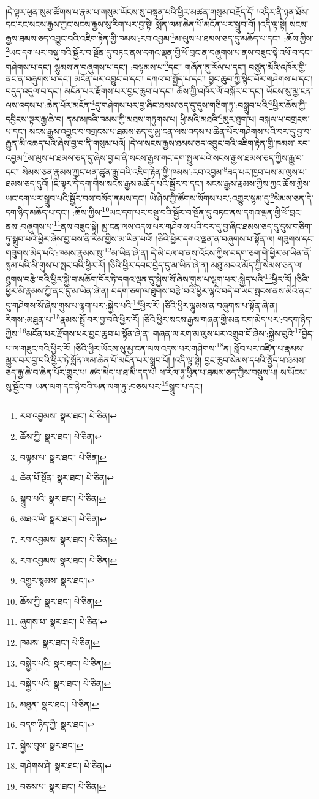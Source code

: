 །དེ་ལྟར་ཕུན་སུམ་ཚོགས་པ་རྣམ་པ་གསུམ་ཡོངས་སུ་བསྟན་པའི་ཕྱིར་མཚན་གསུམ་བརྗོད་དོ། །འདིར་ནི་ཉན་ཐོས་དང་རང་སངས་རྒྱས་ཀྱང་སངས་རྒྱས་སུ་རིག་པར་བྱ་སྟེ། སྨོན་ལམ་ཆེན་པོ་མངོན་པར་སྒྲུབ་བོ། །འདི་ལྟ་སྟེ། སངས་རྒྱས་ཐམས་ཅད་འབྱུང་བའི་འཇིག་རྟེན་གྱི་ཁམས་:རབ་འབྱམ་\footnote{རབ་འབྱམས་  སྣར་ཐང་།  པེ་ཅིན། }མ་ལུས་པ་ཐམས་ཅད་དུ་མཆོད་པ་དང་། :ཆོས་ཀྱིས་\footnote{ཆོས་ཀྱི་  སྣར་ཐང་།  པེ་ཅིན། }ཡང་དག་པར་བསྡུ་བའི་སྦྱོར་བ་སྔོན་དུ་བཏང་ནས་དགའ་ལྡན་གྱི་ཕོ་བྲང་ན་བཞུགས་པ་ནས་བཟུང་སྟེ་འཕོ་བ་དང་། གཤེགས་པ་དང་། ལྷུམས་ན་བཞུགས་པ་དང་། :བལྟམས་པ་\footnote{བལྟམ་པ་  སྣར་ཐང་།  པེ་ཅིན། }དང་། གཞོན་ནུ་རོལ་པ་དང་། བཙུན་མོའི་འཁོར་གྱི་ནང་ན་བཞུགས་པ་དང་། མངོན་པར་འབྱུང་བ་དང་། དཀའ་བ་སྤྱོད་པ་དང་། བྱང་ཆུབ་ཀྱི་སྙིང་པོར་གཤེགས་པ་དང་། བདུད་འདུལ་བ་དང་། མངོན་པར་རྫོགས་པར་བྱང་ཆུབ་པ་དང་། ཆོས་ཀྱི་འཁོར་ལོ་བསྐོར་བ་དང་། ཡོངས་སུ་མྱ་ངན་ལས་འདས་པ་:ཆེན་པོར་མངོན་\footnote{ཆེན་པོ་སྔོན་  སྣར་ཐང་།  པེ་ཅིན། }དུ་གཤེགས་པར་བྱ་ཞིང་ཐམས་ཅད་དུ་དུས་གཅིག་ཏུ་:བསྒྲུབ་པའི་\footnote{སྒྲུབ་པའི་  སྣར་ཐང་།  པེ་ཅིན། }ཕྱིར་ཆོས་ཀྱི་དབྱིངས་ལྟར་རྒྱ་ཆེ་བ། ནམ་མཁའི་ཁམས་ཀྱི་མཐས་གཏུགས་པ། ཕྱི་མའི་མཐའི་\footnote{མཐའ་ཡི་  སྣར་ཐང་།  པེ་ཅིན། }མུར་ཐུག་པ། བསྐལ་པ་བགྲངས་པ་དང་། སངས་རྒྱས་འབྱུང་བ་བགྲངས་པ་ཐམས་ཅད་དུ་མྱ་ངན་ལས་འདས་པ་ཆེན་པོར་གཤེགས་པའི་བར་དུ་བྱ་བ་རྒྱུན་མི་འཆད་པའི་ཞེས་བྱ་བ་ནི་གསུམ་པའོ། །དེ་ལ་སངས་རྒྱས་ཐམས་ཅད་འབྱུང་བའི་འཇིག་རྟེན་གྱི་ཁམས་:རབ་འབྱམ་\footnote{རབ་འབྱམས་  སྣར་ཐང་།  པེ་ཅིན། }མ་ལུས་པ་ཐམས་ཅད་དུ་ཞེས་བྱ་བ་ནི་སངས་རྒྱས་གང་དག་སྤྲུལ་པའི་སངས་རྒྱས་ཐམས་ཅད་ཀྱིས་རྒྱུ་བ་དང་། སེམས་ཅན་རྣམས་ཀྱང་ཕན་ཚུན་རྒྱུ་བའི་འཇིག་རྟེན་གྱི་ཁམས་:རབ་འབྱམ་\footnote{རབ་འབྱམས་  སྣར་ཐང་།  པེ་ཅིན། }ཟད་པར་ཁྱབ་པས་མ་ལུས་པ་ཐམས་ཅད་དུའོ། །ཇི་ལྟར་དེ་དག་གིས་སངས་རྒྱས་མཆོད་པའི་སྦྱོར་བ་དང་། སངས་རྒྱས་རྣམས་ཀྱིས་ཀྱང་ཆོས་ཀྱིས་ཡང་དག་པར་སྒྲུབ་པའི་སྦྱོར་བས་བསོད་ནམས་དང་། ཡེ་ཤེས་ཀྱི་ཚོགས་སོགས་པར་:འགྱུར་སྙམ་དུ་\footnote{འགྱུར་སྙམས་  སྣར་ཐང་། }སེམས་ཅན་དེ་དག་ཉིད་མཆོད་པ་དང་། :ཆོས་ཀྱིས་\footnote{ཆོས་ཀྱི་  སྣར་ཐང་།  པེ་ཅིན། }ཡང་དག་པར་བསྡུ་བའི་སྦྱོར་བ་སྔོན་དུ་བཏང་ནས་དགའ་ལྡན་གྱི་ཕོ་བྲང་ནས་:བཞུགས་པ་\footnote{ཞུགས་པ་  སྣར་ཐང་།  པེ་ཅིན། }ནས་བཟུང་སྟེ། མྱ་ངན་ལས་འདས་པར་གཤེགས་པའི་བར་དུ་བྱ་ཞིང་ཐམས་ཅད་དུ་དུས་གཅིག་ཏུ་སྒྲུབ་པའི་ཕྱིར་ཞེས་བྱ་བས་ནི་རིམ་གྱིས་མ་ཡིན་པའོ། །ཅིའི་ཕྱིར་དགའ་ལྡན་ན་བཞུགས་པ་སྟོན་ལ། གཟུགས་དང་གཟུགས་མེད་པའི་:ཁམས་རྣམས་སུ་\footnote{ཁམས་  སྣར་ཐང་།  པེ་ཅིན། }མ་ཡིན་ཞེ་ན། དེ་མི་ངལ་བ་ནས་འོངས་ཀྱིས་བདག་ཅག་གི་ཕྱིར་མ་ཡིན་ནོ་སྙམ་པའི་མི་གུས་པ་སྤང་བའི་ཕྱིར་རོ། །ཅིའི་ཕྱིར་དབང་བྱེད་དུ་མ་ཡིན་ཞེ་ན། མཐུ་མངའ་མོད་ཀྱི་སེམས་ཅན་ལ་ཐུགས་བརྩེ་བའི་ཕྱིར་སྐྱེ་བ་མཆོག་བོར་ཏེ་དགའ་ལྡན་དུ་སྐྱེས་སོ་ཞེས་གུས་པ་ལྷག་པར་:སྐྱེད་པའི་\footnote{བསྐྱེད་པའི་  སྣར་ཐང་།  པེ་ཅིན། }ཕྱིར་རོ། །ཅིའི་ཕྱིར་མི་རྣམས་ཀྱི་ནང་དུ་མ་ཡིན་ཞེ་ན། བདག་ཅག་ལ་ཐུགས་བརྩེ་བའི་ཕྱིར་ལྷའི་བདེ་བ་ཡང་སྤངས་ནས་མིའི་ནང་དུ་གཤེགས་སོ་ཞེས་གུས་པ་ལྷག་པར་:སྐྱེད་པའི་\footnote{བསྐྱེད་པའི་  སྣར་ཐང་།  པེ་ཅིན། }ཕྱིར་རོ། །ཅིའི་ཕྱིར་ལྷུམས་ན་བཞུགས་པ་སྟོན་ཞེ་ན། རིགས་:མཐུན་པ་\footnote{མཐུན་  སྣར་ཐང་།  པེ་ཅིན། }རྣམས་སྤྲོ་བར་བྱ་བའི་ཕྱིར་རོ། །ཅིའི་ཕྱིར་སངས་རྒྱས་གཞན་གྱི་མན་ངག་མེད་པར་:བདག་ཉིད་ཀྱིས་\footnote{བདག་ཉིད་ཀྱི་  སྣར་ཐང་། }མངོན་པར་རྫོགས་པར་བྱང་ཆུབ་པ་སྟོན་ཞེ་ན། གཞན་ལ་རག་མ་ལུས་པར་འགྲུབ་བོ་ཞེས་:སྐྱེས་བུའི་\footnote{སྐྱེས་བུས་  སྣར་ཐང་། }བྱེད་པ་ལ་གཟུང་བའི་ཕྱིར་རོ། །ཅིའི་ཕྱིར་ཡོངས་སུ་མྱ་ངན་ལས་འདས་པར་གཤེགས་\footnote{གཤེགས་ཤེ་  སྣར་ཐང་།  པེ་ཅིན། }ན། སློབ་པར་འཛིན་པ་རྣམས་མྱུར་བར་བྱ་བའི་ཕྱིར་ཏེ་སྨོན་ལམ་ཆེན་པོ་མངོན་པར་སྒྲུབ་པོ། །འདི་ལྟ་སྟེ། བྱང་ཆུབ་སེམས་དཔའི་སྤྱོད་པ་ཐམས་ཅད་རྒྱ་ཆེ་བ་ཆེན་པོར་གྱུར་པ། ཚད་མེད་པ་ཐ་མི་དད་པ། ཕ་རོལ་ཏུ་ཕྱིན་པ་ཐམས་ཅད་ཀྱིས་བསྡུས་པ། ས་ཡོངས་སུ་སྦྱོང་བ། ཡན་ལག་དང་ཉེ་བའི་ཡན་ལག་ཏུ་:བཅས་པར་\footnote{བཅས་པ་  སྣར་ཐང་།  པེ་ཅིན། }སྒྲུབ་པ་དང་། 